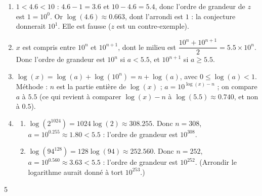 {\begin{enumerate}
\begin{enumerate}[label=\alph*.]
  \item $\log(\num{27,6})\approx\num{1,441}$ et $\log(812)\approx\num{2,910}$. Les arrondis à l'unité sont $1$ et $3$ : conjecture « l'ordre de grandeur de $x$ est $10^{k}$, où $k$ est l'arrondi à l'unité de $\log(x)$ ».
  \end{enumerate}
\item $1<\num{4,6}<10$ : $\num{4,6}-1=\num{3,6}$ et $10-\num{4,6}=\num{5,4}$, donc l'ordre de grandeur de $z$ est $1=10^0$. Or $\log(\num{4,6})\approx\num{0,663}$, dont l'arrondi est $1$ : la conjecture donnerait $10^1$. Elle est fausse ($z$ est un contre-exemple).
\item $x$ est compris entre $10^n$ et $10^{n+1}$, dont le milieu est $\dfrac{10^n+10^{n+1}}2=\num{5,5}\times10^n$. Donc l'ordre de grandeur est $10^n$ si $a<\num{5,5}$, et $10^{n+1}$ si $a\geqslant\num{5,5}$.
\item $\log(x)=\log(a)+\log(10^n)=n+\log(a)$, avec $0\leqslant\log(a)<1$. Méthode : $n$ est la partie entière de $\log(x)$ ; $a=10^{\log(x)-n}$ ; on compare $a$ à $\num{5,5}$ (ce qui revient à comparer $\log(x)-n$ à $\log(\num{5,5})\approx\num{0,740}$, et non à $\num{0,5}$).
\item
  \begin{enumerate}[label=\alph*.]
  \item $\log(2^{\num{1024}})=\num{1024}\log(2)\approx\num{308,255}$. Donc $n=308$, $a=10^{\num{0,255}}\approx\num{1,80}<\num{5,5}$ : l'ordre de grandeur est $10^{308}$.
  \item $\log(94^{128})=128\log(94)\approx\num{252,560}$. Donc $n=252$, $a=10^{\num{0,560}}\approx\num{3,63}<\num{5,5}$ : l'ordre de grandeur est $10^{252}$. (Arrondir le logarithme aurait donné à tort $10^{253}$.)
  \end{enumerate}
\end{enumerate}
}{5}

